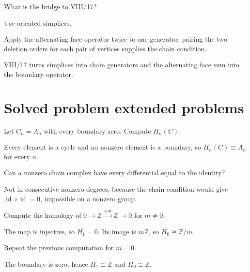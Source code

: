 \begin{exercise}\label{exr:viii16-24}
What is the bridge to VIII/17?
\end{exercise}
\begin{hint}
Use oriented simplices.

Apply the alternating face operator twice to one generator; pairing the two deletion orders for each pair of vertices supplies the chain condition.
\end{hint}
\begin{solution}
VIII/17 turns simplices into chain generators and the alternating face sum into the boundary operator.
\end{solution}


\section{Solved problem extended problems}

\begin{problem}\label{prob:viii16-01}
Let \(C_n=A_n\) with every boundary zero. Compute \(H_n(C)\).
\end{problem}
\begin{solution}
Every element is a cycle and no nonzero element is a boundary, so \(H_n(C)\cong A_n\) for every \(n\).
\end{solution}

\begin{problem}\label{prob:viii16-02}
Can a nonzero chain complex have every differential equal to the identity?
\end{problem}
\begin{solution}
Not in consecutive nonzero degrees, because the chain condition would give \(\operatorname{id}\circ\operatorname{id}=0\), impossible on a nonzero group.
\end{solution}

\begin{problem}\label{prob:viii16-03}
Compute the homology of \(0\to\mathbb Z\xrightarrow{\times m}\mathbb Z\to0\) for \(m\ne0\).
\end{problem}
\begin{solution}
The map is injective, so \(H_1=0\). Its image is \(m\mathbb Z\), so \(H_0\cong\mathbb Z/m\).
\end{solution}

\begin{problem}\label{prob:viii16-04}
Repeat the previous computation for \(m=0\).
\end{problem}
\begin{solution}
The boundary is zero, hence \(H_1\cong\mathbb Z\) and \(H_0\cong\mathbb Z\).
\end{solution}

